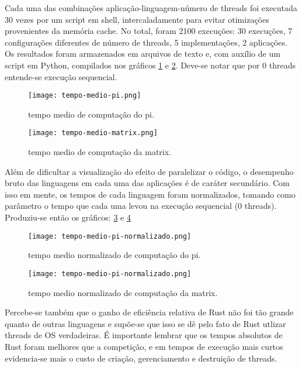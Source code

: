 \documentclass{article}
\begin{document}
Cada uma das combinações aplicação-linguagem-número de threads foi executada 30 vezes por um script em shell, intercaladamente para evitar otimizações provenientes da memória cache. No total, foram 2100 execuções: 30 execuções, 7 configurações diferentes de número de threads, 5 implementações, 2 aplicações. Os resultados foram armazenados em arquivos de texto e, com auxílio de um script em Python,  compilados nos gráficos \ref{fig:tempo medio pi} e \ref{fig:tempo medio matrix}. Deve-se notar que por 0 threads entende-se execução sequencial.

\begin{figure}[t] %
    \centering
    \texttt{[image: tempo-medio-pi.png]}
    \caption{tempo medio de computação do pi.}
    \label{fig:tempo medio pi}
\end{figure}

\begin{figure}[t] %
    \centering
    \texttt{[image: tempo-medio-matrix.png]}
    \caption{tempo medio de computação da matrix.}
    \label{fig:tempo medio matrix}
\end{figure}

Além de dificultar a visualização do efeito de paralelizar o código, o desempenho bruto das linguagens em cada uma das aplicações é de caráter secundário. Com isso em mente, os tempos de cada linguagem foram normalizados, tomando como parâmetro o tempo que cada uma levou na execução sequencial (0 threads). Produziu-se então os gráficos: \ref{fig:tempo medio norm pi} e \ref{fig:tempo medio norm matrix}

\begin{figure}[t] %
    \centering
    \texttt{[image: tempo-medio-pi-normalizado.png]}
    \caption{tempo medio normalizado de computação do pi.}
    \label{fig:tempo medio norm pi}
\end{figure}

\begin{figure}[t] %
    \centering
    \texttt{[image: tempo-medio-pi-normalizado.png]}
    \caption{tempo medio normalizado de computação da matrix.}
    \label{fig:tempo medio norm matrix}
\end{figure}

Percebe-se também que o ganho de eficiência relativa de Rust não foi tão grande quanto de outras linguagens e supõe-se que isso se dê pelo fato de Rust utlizar threads de OS verdadeiras. É importante lembrar que os tempos absolutos de Rust foram melhores que a competição, e em tempos de execução mais curtos evidencia-se mais o custo de criação, gerenciamento e destruição de threads.
\end{document}
